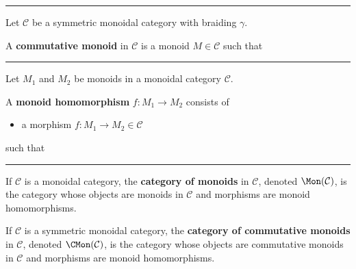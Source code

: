 \documentclass[12pt]{article}
\newcommand{\keyword}[1]{\textbf{#1}}
\newcommand{\sepline}{\rule{\textwidth}{0.4pt}}
\newenvironment{cd}{\begin{center}\begin{tikzcd}}{\end{tikzcd}\end{center}}
\theoremstyle{definition}
\newcommand{\CC}{\mathcal{C}}
\newcommand{\<}{\left\langle}
\renewcommand{\>}{\right\rangle}
\newcommand{\tensor}{\otimes}
\begin{document}
\sepline

Let $\CC$ be a symmetric monoidal category with braiding $\gamma$.

A \keyword{commutative monoid} in $\CC$ is a monoid $M \in \CC$ such that

\sepline

Let $M_1$ and $M_2$ be monoids in a monoidal category $\CC$.

A \keyword{monoid homomorphism} $f : M_1 \to M_2$ consists of 
\begin{itemize}
    \item a morphism $f : M_1 \to M_2 \in \CC$
\end{itemize}
such that

\sepline

If $\CC$ is a monoidal category, the \keyword{category of monoids} in $\CC$, denoted $\Mon(\CC)$, is the category whose objects are monoids in $\CC$ and morphisms are monoid homomorphisms.

If $\CC$ is a symmetric monoidal category, the \keyword{category of commutative monoids} in $\CC$, denoted $\CMon(\CC)$, is the category whose objects are commutative monoids in $\CC$ and morphisms are monoid homomorphisms.
\end{document}
